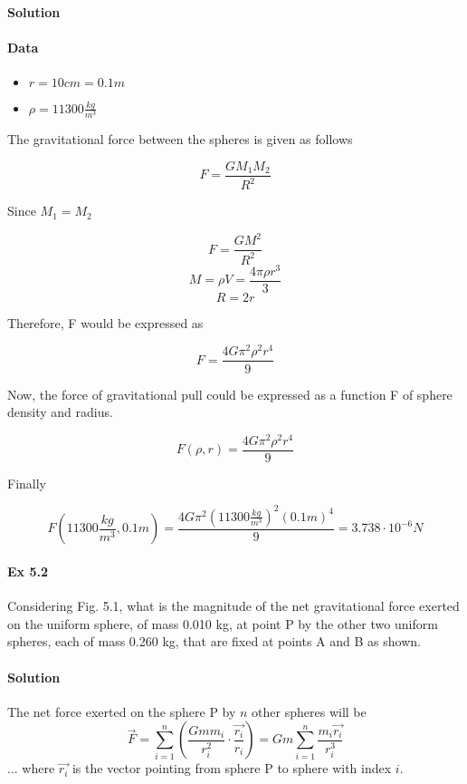 \documentclass{article}
\begin{document}
\paragraph{Solution}

\paragraph{Data}
\begin{itemize}
    \item $r = 10 cm = 0.1 m$
    \item $\rho = 11300 \frac{kg}{m^3}$ 
\end{itemize}

The gravitational force between the spheres is given as follows

\[F = \frac{GM_1M_2}{R^2}\]

Since $M_1 = M_2$

\[F = \frac{GM^2}{R^2}\]
\[M = \rho V = \frac{4 \pi \rho r^3}{3}\]
\[R = 2r\]

Therefore, F would be expressed as

\[F = \frac{4 G \pi^2 \rho^2 r^4}{9}\]

Now, the force of gravitational pull could be expressed as a function F of sphere density and radius.

\[F(\rho, r) = \frac{4 G \pi^2 \rho^2 r^4}{9}\]

Finally

\[F(11300 \frac{kg}{m^3}, 0.1m) = \frac{4 G \pi^2 (11300 \frac{kg}{m^3})^2 (0.1m)^4}{9} = 3.738 \cdot 10^{-6} N\]


\paragraph{Ex 5.2}
Considering Fig. 5.1, what is the magnitude of the net gravitational force exerted on the uniform sphere, of mass 0.010 kg, at point P by the other two uniform spheres, each of mass 0.260 kg, that are fixed at points A and B as shown.
\paragraph{Solution}

The net force exerted on the sphere P by $n$ other spheres will be
\[ \vec{F} = \sum_{i=1}^{n} \left( \frac{Gmm_i}{r_i^2} \cdot \frac{\vec{r_i}}{r_i} \right) = Gm \sum_{i=1}^{n} \frac{m_i \vec{r_i}}{r_i^3}  \]
... where $\vec{r_i}$ is the vector pointing from sphere P to sphere with index $i$.
\end{document}
